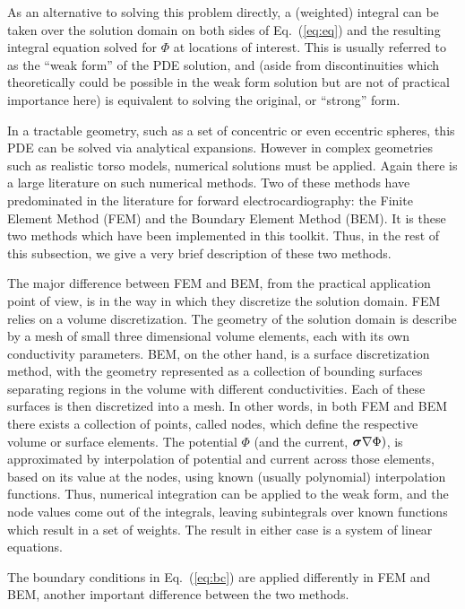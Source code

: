 \documentclass[fleqn,11pt,openany]{book}
\newcommand{\BM }[1]{\mbox{\boldmath $#1$}}
\begin{document}
As an alternative to solving this problem directly, a (weighted) integral
can be taken over the solution domain on both sides of Eq.~(\ref{eq:eq})
and the resulting integral equation solved for $\Phi$ at locations of
interest. This is usually referred to as the ``weak form'' of the PDE
solution, and (aside from discontinuities which theoretically could be
possible in the weak form solution but are not of practical importance
here) is equivalent to solving the original, or ``strong'' form.

In a tractable geometry, such as a set of concentric or even eccentric
spheres, this PDE can be solved via analytical expansions. However in
complex geometries such as realistic torso models, numerical solutions must
be applied. Again there is a large literature on such numerical
methods. Two of these methods have predominated in the literature for
forward electrocardiography: the Finite Element Method (FEM) and the
Boundary Element Method (BEM). It is these two methods which have been
implemented in this toolkit. Thus, in the rest of this subsection, we give a
very brief description of these two methods.

The major difference between FEM and BEM, from the practical application point of view,
is in the way in which they discretize the solution domain.
FEM relies on a volume discretization. The geometry of the solution domain
is describe by a mesh of small three dimensional volume elements,
each with its own conductivity parameters.
BEM, on the other hand, is a surface discretization
method, with the geometry represented as a collection of bounding surfaces
separating regions in the volume with different conductivities. Each of
these surfaces is then discretized into a mesh. In other words, in both FEM
and BEM there exists a collection of points, called nodes, which define the
respective volume or surface elements. The potential $\Phi$ (and the
current, $\BM{\sigma} \nabla \Phi)$, is approximated by interpolation of
potential and current across those elements, based on its value at the
nodes, using known (usually polynomial) interpolation functions. Thus,
numerical integration can be applied to the weak form, and the node values
come out of the integrals, leaving subintegrals over known functions which
result in a set of weights. The result in either case is a system of
linear equations.

The boundary conditions in Eq.~(\ref{eq:bc}) are applied differently  in FEM
and BEM, another important difference between the two methods.
\end{document}
